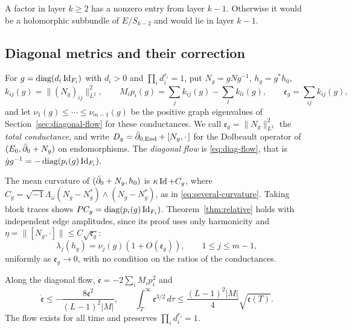 A factor in layer $k\ge2$ has a nonzero entry from layer $k-1$.
Otherwise it would be a holomorphic subbundle of $E/S_{k-2}$ and would lie
in layer $k-1$.

\subsection{Diagonal metrics and their correction}

For $g=\operatorname{diag}(d_i\operatorname{Id}_{F_i})$ with $d_i>0$ and $\prod_id_i^{r_i}=1$, put
$N_g=gNg^{-1}$, $h_g=g^*h_0$,
\[
 k_{ij}(g)=\lVert(N_g)_{ij}\rVert_{L^2}^2,\qquad
 M_ip_i(g)=\sum_{j}k_{ij}(g)-\sum_{l}k_{li}(g),\qquad
 \mathfrak e_g=\sum_{ij}k_{ij}(g),
\]
and let $\nu_1(g)\le\cdots\le\nu_{m-1}(g)$ be the positive graph
eigenvalues of Section~\ref{sec:diagonal-flow} for these conductances. We
call $\mathfrak e_g=\lVert N_g\rVert_{L^2}^2$ the \emph{total conductance},
and write $D_g=\bar\partial_{0,\operatorname{End}}+[N_g,\cdot\,]$ for the Dolbeault operator of
$(E_0,\bar\partial_0+N_g)$ on endomorphisms. The
\emph{diagonal flow} is \eqref{eq:diag-flow}, that is
$\dot gg^{-1}=-\operatorname{diag}(p_i(g)\operatorname{Id}_{F_i})$.

The mean curvature of $(\bar\partial_0+N_g,h_0)$ is $\kappa\operatorname{Id}+C_g$, where
$C_g=\sqrt{-1}\Lambda_\omega(N_g-N_g^*)\wedge(N_g-N_g^*)$, as in
\eqref{eq:several-curvature}. Taking block traces shows
$PC_g=\operatorname{diag}(p_i(g)\operatorname{Id}_{F_i})$. Theorem~\ref{thm:relative} holds with
independent edge amplitudes, since its proof uses only harmonicity and
$\eta=\lVert[N_g,\cdot]\rVert\le C\sqrt{\mathfrak e_g}$:
\begin{equation}\label{eq:general-independent-comparison}
 \lambda_j(h_g)=\nu_j(g)(1+O(\mathfrak e_g)),\qquad 1\le j\le m-1,
\end{equation}
uniformly as $\mathfrak e_g\to0$, with no condition on the ratios of the conductances.

\begin{lemma}\label{lem:layer-energy}
Along the diagonal flow, $\dot{\mathfrak e}=-2\sum_iM_ip_i^2$ and
\begin{equation}\label{eq:layer-energy}
 \dot{\mathfrak e}\le-\frac{8\mathfrak e^2}{(L-1)^2|M|},\qquad
 \int_T^\infty\mathfrak e^{3/2}\,d\tau\le\frac{(L-1)^2|M|}{4}\sqrt{\mathfrak e(T)}.
\end{equation}
The flow exists for all time and preserves $\prod_id_i^{r_i}=1$.
\end{lemma}

